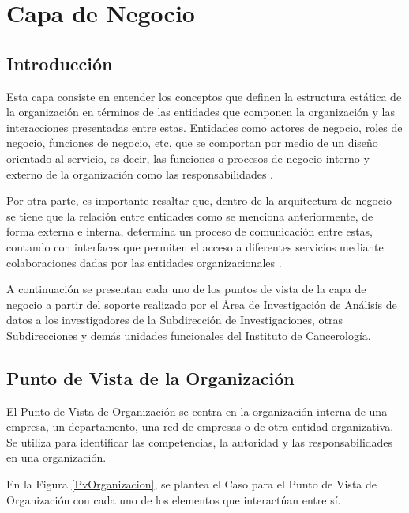 \chapter{Capa de Negocio}
\section{Introducción}

Esta capa consiste en entender los conceptos que definen la estructura estática de la organización en términos de las entidades que componen la organización y las interacciones presentadas entre estas. Entidades como actores de negocio, roles de negocio, funciones de negocio, etc, que se comportan por medio de un diseño orientado al servicio, es decir, las funciones o procesos de negocio interno y externo de la organización como las responsabilidades \cite{BolanosCastro2019}.

Por otra parte, es importante resaltar que, dentro de la arquitectura de negocio se tiene que la relación entre entidades como se menciona anteriormente, de forma externa e interna, determina un proceso de comunicación entre estas, contando con interfaces que permiten el acceso a diferentes servicios mediante colaboraciones dadas por las entidades organizacionales \cite{BolanosCastro2019}.

A continuación se presentan cada uno de los puntos de vista de la capa de negocio  a partir del soporte realizado por el Área de Investigación de Análisis de datos a los investigadores de la Subdirección de Investigaciones, otras Subdirecciones y demás unidades funcionales del Instituto  de Cancerología.

\newpage
\section{Punto de Vista de la Organización}
El Punto de Vista de Organización se centra en la organización interna de una empresa, un departamento, una red de empresas o de otra entidad organizativa. Se utiliza para identificar las competencias, la autoridad y las responsabilidades en una organización\cite{BolanosCastro2019}.

En la Figura \ref{PvOrganizacion}, se plantea el Caso para el Punto de Vista de Organización con cada uno de los elementos que interactúan entre sí. 

